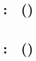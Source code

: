 \documentclass{article}
\begin{document}
\title{\lectype\ \lecfulltitle}

\author{\lecinstructor}

\date{\lecsemester}

\maketitle


\section*{\lectypesession~\sesnr: \sesfulltitle\ (\sesdate)}

\lipsum


\section*{\lectypesession~\sesnr: \sesfulltitle\ (\sesdate)}

\lipsum
\end{document}
